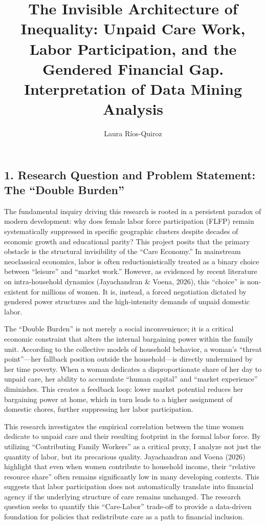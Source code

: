 \documentclass[
  letterpaper,
  DIV=11,
  numbers=noendperiod]{scrartcl}
\title{The Invisible Architecture of Inequality: Unpaid Care Work, Labor
Participation, and the Gendered Financial Gap. Interpretation of Data
Mining Analysis}
\author{Laura Ríos-Quiroz}
\date{}
\begin{document}
\maketitle


\subsection{1. Research Question and Problem Statement: The ``Double
Burden''}\label{research-question-and-problem-statement-the-double-burden}

The fundamental inquiry driving this research is rooted in a persistent
paradox of modern development: why does female labor force participation
(FLFP) remain systematically suppressed in specific geographic clusters
despite decades of economic growth and educational parity? This project
posits that the primary obstacle is the structural invisibility of the
``Care Economy.'' In mainstream neoclassical economics, labor is often
reductionistically treated as a binary choice between ``leisure'' and
``market work.'' However, as evidenced by recent literature on
intra-household dynamics (Jayachandran \& Voena, 2026), this ``choice''
is non-existent for millions of women. It is, instead, a forced
negotiation dictated by gendered power structures and the high-intensity
demands of unpaid domestic labor.

The ``Double Burden'' is not merely a social inconvenience; it is a
critical economic constraint that alters the internal bargaining power
within the family unit. According to the collective models of household
behavior, a woman's ``threat point''---her fallback position outside the
household---is directly undermined by her time poverty. When a woman
dedicates a disproportionate share of her day to unpaid care, her
ability to accumulate ``human capital'' and ``market experience''
diminishes. This creates a feedback loop: lower market potential reduces
her bargaining power at home, which in turn leads to a higher assignment
of domestic chores, further suppressing her labor participation.

This research investigates the empirical correlation between the time
women dedicate to unpaid care and their resulting footprint in the
formal labor force. By utilizing ``Contributing Family Workers'' as a
critical proxy, I analyze not just the quantity of labor, but its
precarious quality. Jayachandran and Voena (2026) highlight that even
when women contribute to household income, their ``relative resource
share'' often remains significantly low in many developing contexts.
This suggests that labor participation does not automatically translate
into financial agency if the underlying structure of care remains
unchanged. The research question seeks to quantify this ``Care-Labor''
trade-off to provide a data-driven foundation for policies that
redistribute care as a path to financial inclusion.
\end{document}
